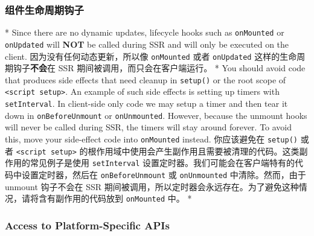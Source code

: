 \begin{paracol}{2}
\subsubsection{组件生命周期钩子}
\switchcolumn[0]*%
Since there are no dynamic updates, lifecycle hooks such as
\texttt{onMounted} or \texttt{onUpdated} will \textbf{NOT} be called
during SSR and will only be executed on the client.
\switchcolumn
因为没有任何动态更新，所以像 \texttt{onMounted} 或者 \texttt{onUpdated}
这样的生命周期钩子\textbf{不会}在 SSR 期间被调用，而只会在客户端运行。
\switchcolumn[0]*%
You should avoid code that produces side effects that need cleanup in
\texttt{setup()} or the root scope of
\texttt{\textless{}script\ setup\textgreater{}}. An example of such side
effects is setting up timers with \texttt{setInterval}. In client-side
only code we may setup a timer and then tear it down in
\texttt{onBeforeUnmount} or \texttt{onUnmounted}. However, because the
unmount hooks will never be called during SSR, the timers will stay
around forever. To avoid this, move your side-effect code into
\texttt{onMounted} instead.
\switchcolumn
你应该避免在 \texttt{setup()} 或者
\texttt{\textless{}script\ setup\textgreater{}}
的根作用域中使用会产生副作用且需要被清理的代码。这类副作用的常见例子是使用
\texttt{setInterval}
设置定时器。我们可能会在客户端特有的代码中设置定时器，然后在
\texttt{onBeforeUnmount} 或 \texttt{onUnmounted} 中清除。然而，由于
unmount 钩子不会在 SSR
期间被调用，所以定时器会永远存在。为了避免这种情况，请将含有副作用的代码放到
\texttt{onMounted} 中。
\switchcolumn[0]*%
\subsubsection{Access to Platform-Specific APIs}
\switchcolumn

\end{paracol}

